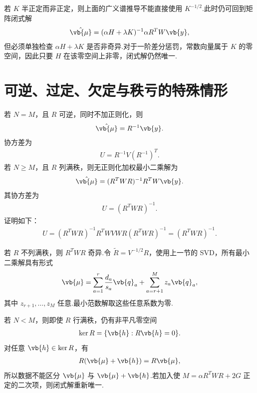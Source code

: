 \begin{note}
	若 \(K\) 半正定而非正定，则上面的广义谱推导不能直接使用 \(K^{-1/2}\).此时仍可回到矩阵闭式解
	\begin{align*}
		\hat{\vb{\mu}}
		=(\alpha H+\lambda K)^{-1}\alpha R^TW\vb{y},
	\end{align*}
	但必须单独检查 \(\alpha H+\lambda K\) 是否非奇异.对于一阶差分惩罚，常数向量属于 \(K\) 的零空间，因此只要 \(H\) 在该零空间上非零，闭式解仍然唯一.
\end{note}

\section{可逆、过定、欠定与秩亏的特殊情形}

若 \(N=M\)，且 \(R\) 可逆，同时不加正则化，则
\begin{align*}
	\hat{\vb{\mu}}=R^{-1}\vb{y}.
\end{align*}
协方差为
\begin{align*}
	U=R^{-1}V(R^{-1})^T.
\end{align*}
若 \(N\geq M\)，且 \(R\) 列满秩，则无正则化加权最小二乘解为
\begin{align*}
	\hat{\vb{\mu}}
	=(R^TWR)^{-1}R^TW\vb{y}.
\end{align*}
其协方差为
\begin{align*}
	U=(R^TWR)^{-1}.
\end{align*}
证明如下：
\begin{align*}
	U
	=(R^TWR)^{-1}R^TWVWR(R^TWR)^{-1}
	=(R^TWR)^{-1}.
\end{align*}

若 \(R\) 不列满秩，则 \(R^TWR\) 奇异.令 \(\tilde{R}=V^{-1/2}R\)，使用上一节的 SVD，所有最小二乘解具有形式
\begin{align*}
	\vb{\mu}
	=\sum_{a=1}^{r}\frac{d_a}{s_a}\vb{q}_a
	+\sum_{a=r+1}^{M}z_a\vb{q}_a,
\end{align*}
其中 \(z_{r+1},\ldots,z_M\) 任意.最小范数解取这些任意系数为零.

若 \(N<M\)，则即使 \(R\) 行满秩，仍有非平凡零空间
\begin{align*}
	\ker R=\{\vb{h}:R\vb{h}=0\}.
\end{align*}
对任意 \(\vb{h}\in\ker R\)，有
\begin{align*}
	R(\vb{\mu}+\vb{h})=R\vb{\mu},
\end{align*}
所以数据不能区分 \(\vb{\mu}\) 与 \(\vb{\mu}+\vb{h}\).若加入使 \(M=\alpha R^TWR+2G\) 正定的二次项，则闭式解重新唯一.

